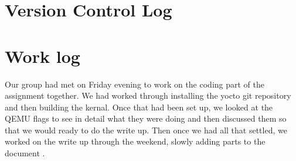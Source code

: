 \documentclass[10pt, onecolumn, letterpaper, draftclsnofoot]{IEEEtran}
\begin{document}
\section{Version Control Log}


\section{Work log}
Our group had met on Friday evening to work on the coding part of the assignment 
together. We had worked through installing the yocto git repository and then building 
the kernal. Once that had been set up, we looked at the QEMU flags to see in detail 
what they were doing and then discussed them so that we would ready to do the write up. 
Then once we had all that settled, we worked on the write up through the weekend,
slowly adding parts to the document \cite{Doc:1}.

\newpage


\end{document}
